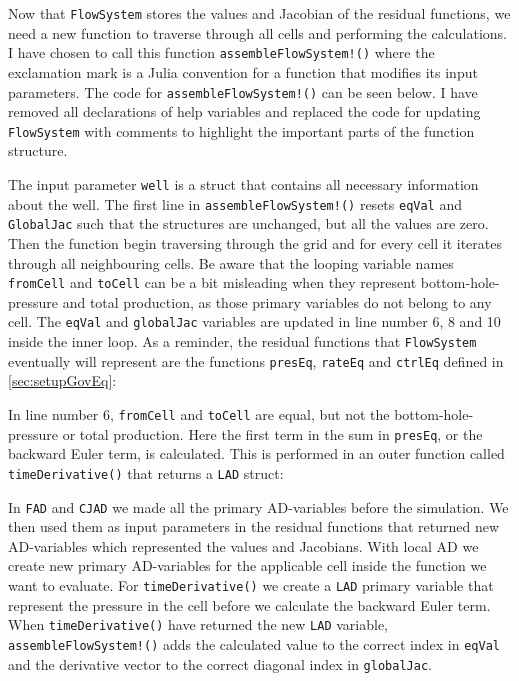 Now that \texttt{FlowSystem} stores the  values and Jacobian of the residual functions, we need a new function to traverse through all cells and performing the calculations. I have chosen to call this function \texttt{assembleFlowSystem!()} where the exclamation mark is a Julia convention for a function that modifies its input parameters. The code for \texttt{assembleFlowSystem!()} can be seen below. I have removed all declarations of help variables and replaced the code for updating \texttt{FlowSystem} with comments to highlight the important parts of the function structure.
\lstset{numbers=left}

\lstset{numbers=none}
The input parameter \texttt{well} is a struct that contains all necessary information about the well. The first line in \texttt{assembleFlowSystem!()} resets \texttt{eqVal} and \texttt{GlobalJac} such that the structures are unchanged, but all the values are zero. Then the function begin traversing through the grid and for every cell it iterates through all neighbouring cells. Be aware that the looping variable names \texttt{fromCell} and \texttt{toCell} can be a bit misleading when they represent bottom-hole-pressure and total production, as those primary variables do not belong to any cell. The \texttt{eqVal} and \texttt{globalJac} variables are updated in line number 6, 8 and 10 inside the inner loop. As a reminder, the residual functions that \texttt{FlowSystem} eventually will represent are the functions \texttt{presEq}, \texttt{rateEq} and \texttt{ctrlEq} defined in \autoref{sec:setupGovEq}:

In line number 6, \texttt{fromCell} and \texttt{toCell} are equal, but not the bottom-hole-pressure or total production. Here the first term in the sum in \texttt{presEq}, or the backward Euler term, is calculated. This is performed in an outer function called \texttt{timeDerivative()} that returns a \texttt{LAD} struct:

In \texttt{FAD} and \texttt{CJAD} we made all the primary AD-variables before the simulation. We then used them as input parameters in the residual functions that returned new AD-variables which represented the values and Jacobians. With local AD we create new primary AD-variables for the applicable cell inside the function we want to evaluate. For \texttt{timeDerivative()} we create a \texttt{LAD} primary variable that represent the pressure in the cell before we calculate the backward Euler term. When \texttt{timeDerivative()} have returned the new \texttt{LAD} variable, \texttt{assembleFlowSystem!()} adds the calculated value to the correct index in \texttt{eqVal} and the derivative vector to the correct diagonal index in \texttt{globalJac}.

